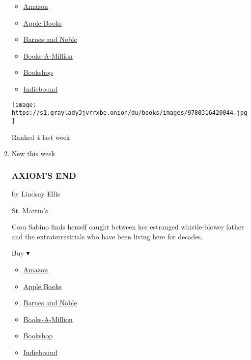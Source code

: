\begin{enumerate}
  \begin{itemize}
  \tightlist
  \item
    \href{https://www.amazon.com/dp/0316420042?tag=NYTBSREV-20\&tag=NYTBS-20}{Amazon}
  \item
    \href{https://du-gae-books-dot-nyt-du-prd.appspot.com/buy?title=28+SUMMERS\&author=Elin+Hilderbrand}{Apple
    Books}
  \item
    \href{https://www.anrdoezrs.net/click-7990613-11819508?url=https\%3A\%2F\%2Fwww.barnesandnoble.com\%2Fw\%2F\%3Fean\%3D9780316420044}{Barnes
    and Noble}
  \item
    \href{https://www.anrdoezrs.net/click-7990613-35140?url=https\%3A\%2F\%2Fwww.booksamillion.com\%2Fp\%2F28\%2BSUMMERS\%2FElin\%2BHilderbrand\%2F9780316420044}{Books-A-Million}
  \item
    \href{https://bookshop.org/a/3546/9780316420044}{Bookshop}
  \item
    \href{https://www.indiebound.org/book/9780316420044?aff=NYT}{Indiebound}
  \end{itemize}

  \texttt{[image: https://s1.graylady3jvrrxbe.onion/du/books/images/9780316420044.jpg]}

  Ranked 4 last week
\item
  New this week

  \hypertarget{axioms-end}{%
  \subsubsection{AXIOM'S END}\label{axioms-end}}

  by Lindsay Ellis

  St. Martin's

  Cora Sabino finds herself caught between her estranged whistle-blower
  father and the extraterrestrials who have been living here for
  decades.

  Buy ▾

  \begin{itemize}
  \tightlist
  \item
    \href{https://www.amazon.com/dp/1250256739?tag=NYTBSREV-20\&tag=NYTBS-20}{Amazon}
  \item
    \href{https://du-gae-books-dot-nyt-du-prd.appspot.com/buy?title=AXIOM\%27S+END\&author=Lindsay+Ellis}{Apple
    Books}
  \item
    \href{https://www.anrdoezrs.net/click-7990613-11819508?url=https\%3A\%2F\%2Fwww.barnesandnoble.com\%2Fw\%2F\%3Fean\%3D9781250256737}{Barnes
    and Noble}
  \item
    \href{https://www.anrdoezrs.net/click-7990613-35140?url=https\%3A\%2F\%2Fwww.booksamillion.com\%2Fp\%2FAXIOM\%2527S\%2BEND\%2FLindsay\%2BEllis\%2F9781250256737}{Books-A-Million}
  \item
    \href{https://bookshop.org/a/3546/9781250256737}{Bookshop}
  \item
    \href{https://www.indiebound.org/book/9781250256737?aff=NYT}{Indiebound}
  \end{itemize}


\end{enumerate}
